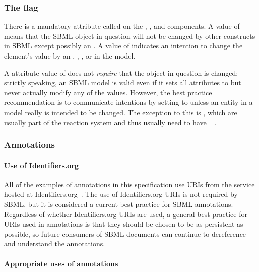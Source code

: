\subsubsection{The  flag}
\label{sec:bp:constant}

There is a mandatory  attribute called  on
the \Compartment, \Species, \SpeciesReference and
\Parameter components.  A value of  means that the SBML
object in question will not be changed by other constructs in SBML
except possibly an \InitialAssignment.  A value of 
indicates an intention to change the element's value by an
\AssignmentRule, \RateRule, \AlgebraicRule, \Reaction or \Event in
the model.

A  attribute value of  does not
\emph{require} that the object in question is changed; strictly
speaking, an SBML model is valid even if it sets all
 attributes to  but never actually
modify any of the values.  However, the best practice
recommendation is to communicate intentions by setting
 to  unless an entity in a model really
is intended to be changed.  The exception to this is \Species,
which are usually part of the reaction system and thus usually
need to have =.


\subsubsection{Annotations}
\label{sec:bp:annotations}

\paragraph{Use of Identifiers.org}

All of the examples of annotations in this specification use URIs from the service hosted at Identifiers.org~\citep{juty:2012}.  The use of Identifiers.org URIs is not required by SBML, but it is considered a current best practice for SBML annotations.  Regardless of whether Identifiers.org URIs are used, a general best practice for URIs used in annotations is that they should be chosen to be as persistent as possible, so future consumers of SBML documents can continue to dereference and understand the annotations.

\paragraph{Appropriate uses of annotations}

